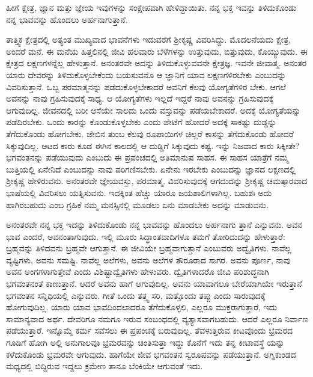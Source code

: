 {\small ಹೀಗೆ ಕ್ಷೇತ್ರ, ಜ್ಞಾನ ಮತ್ತು ಜ್ಞೇಯ ಇವುಗಳನ್ನು ಸಂಕ್ಷೇಪವಾಗಿ ಹೇಳಿದ್ದಾಯಿತು. ನನ್ನ ಭಕ್ತ ಇವನ್ನು ತಿಳಿದುಕೊಂಡು ನನ್ನ ಭಾವವನ್ನು ಹೊಂದಲು ಅರ್ಹನಾಗುತ್ತಾನೆ.}

ತಾತ್ತ್ವಿಕ ಕ್ಷೇತ್ರದಲ್ಲಿ ಅತ್ಯಂತ ಮುಖ್ಯವಾದ ಭಾವನೆಗಳು ಇದುವರೆಗೆ ಶ‍್ರೀಕೃಷ್ಣ ವಿವರಿಸಿದ್ದು. ಮೊದಲನೆಯದು ಕ್ಷೇತ್ರ, ಅಂದರೆ ಮನೆ. ಈ ಮನೆಯ ಹಿತ್ತಲಿನಲ್ಲಿ ಜೀವಿ ಹಲವಾರು ಬೆಳೆಗಳನ್ನು ಉತ್ತುವುದು, ಬಿತ್ತುವುದು, ಕೊಯ್ಯುವುದು. ಈ ಕ್ಷೇತ್ರದ ಲಕ್ಷಣಗಳನ್ನೆಲ್ಲ ಹೇಳುತ್ತಾನೆ. ಅನಂತರವೇ ಅದನ್ನು ತಿಳಿದುಕೊಳ್ಳುವವನೇ ಕ್ಷೇತ್ರಜ್ಞ. ಇವನೇ ಜೀವಾತ್ಮ. ಅನಂತರ ಯಾರು ದೇವರನ್ನು ತಿಳಿದುಕೊಳ್ಳಬೇಕೆಂದು ಬಯಸುವನೊ ಆ ಜ್ಞಾನಿಗೆ ಯಾವ ಲಕ್ಷಣಗಳಿರಬೇಕು ಎಂಬುದನ್ನು ವಿವರಿಸುತ್ತಾನೆ. ಒಬ್ಬ ಪರಮಾತ್ಮನನ್ನು ಪಡೆದುಕೊಳ್ಳಬೇಕಾದರೆ ಅವನಿಗೆ ಕೆಲವು ಯೋಗ್ಯತೆಗಳಿರ ಬೇಕು. ಆಗಲೆ ಅವನನ್ನು ನಾವು ಗ್ರಹಿಸುವುದಕ್ಕೆ ಸಾಧ್ಯ. ಆ ಯೋಗ್ಯತೆಗಳು ಇಲ್ಲದೆ ಇದ್ದರೆ ನಾವು ಅವನನ್ನು ಗ್ರಹಿಸುವುದಕ್ಕೆ ಆಗುವುದಿಲ್ಲ. ಜೀವನದಲ್ಲಿ ಬರೀ ಆಸೆಯೇ ಸಾಲದು ಒಂದು ವಸ್ತುವನ್ನು ಪಡೆಯಬೇಕಾದರೆ. ಅದಕ್ಕೆ ಯೋಗ್ಯತೆಯನ್ನು ಪಡೆದಿರಬೇಕು. ಒಂದು ಕಾರನ್ನು ಕೊಂಡುಕೊಳ್ಳಬೇಕು ಎಂದು ಪೇಟೆಗೆ ಹೋದರೆ ಅದಕ್ಕೆ ಸಾಕಷ್ಟು ದುಡ್ಡನ್ನು ತೆಗೆದುಕೊಂಡು ಹೋಗಬೇಕು. ಜೇಬಿನ ತುಂಬ ಕೆಲವು ರೂಪಾಯಿಗಳ ಚಿಲ್ಲರೆ ಕಾಸನ್ನು ತೆಗೆದುಕೊಂಡು ಹೋದರೆ ಸಿಕ್ಕುವುದಿಲ್ಲ. ಆಟದ ಕಾರು ಕೂಡ ಈಗಿನ ಕಾಲದಲ್ಲಿ ಆ ದುಡ್ಡಿಗೆ ಸಿಕ್ಕುವುದು ಕಷ್ಟ. ಇನ್ನು ನಿಜವಾದ ಕಾರು ಸಿಕ್ಕೀತೇ? ಭಗವಂತನನ್ನು ಪಡೆಯುವುದು ಎಂಬುದು ಈ ಪ್ರಪಂಚದಲ್ಲಿ ಅತಿಮಾನುಷ ಸಾಹಸ. ಈ ಸಾಹಸ ಯಾತ್ರೆಗೆ ನಮ್ಮ ಬುತ್ತಿಯಲ್ಲಿ ಏನೇನಿದೆ ಎಂಬುದನ್ನು ನಾವು ಪರಿಗಣಿಸಬೇಕು. ಏನೇನು ಇರಬೇಕು ಎಂಬುದನ್ನು ಜ್ಞಾನದ ಲಕ್ಷಣದಲ್ಲಿ ಶ‍್ರೀಕೃಷ್ಣ ಹೇಳಿರುವನು. ಅನಂತರವೇ ಜ್ಞೇಯವಸ್ತು, ಪರಮಾತ್ಮ. ವಿವರಿಸುವುದಕ್ಕೆ ಆಗದುದನ್ನು ಶ‍್ರೀಕೃಷ್ಣ ಚಮತ್ಕಾರವಾದ ಭಾಷೆಯಲ್ಲಿ ವಿವರಿಸಲು ಯತ್ನಿಸುವನು. ಇದಕ್ಕಿಂತ ಹೆಚ್ಚು ಯಾರೂ ಜಯಶಾಲಿಗಳಾಗಿಲ್ಲ. ಬಹುಶಃ ಅದು ಹಾಗಿರಬಹುದು ಎಂಬ ಗ್ರಹಿಕೆ ನಮ್ಮ ಮನಸ್ಸಿನಲ್ಲಿ ಮೂಡಲು ಏನು ಮಾಡಬೇಕು ಅದನ್ನು ಮಾಡುವನು.

ಅನಂತರವೇ ನನ್ನ ಭಕ್ತ ಇದನ್ನು ತಿಳಿದುಕೊಂಡು ನನ್ನ ಭಾವವನ್ನು ಹೊಂದಲು ಅರ್ಹನಾಗು ತ್ತಾನೆ ಎನ್ನುವನು. ಅವನ ಭಾವ ಎಂದರೆ, ಅವನಂತಾಗುವುದು. ಇಲ್ಲಿ ಮೂರು ಸಿದ್ಧಾಂತವಾದಿಗಳೂ ತಮಗೆ ತೋರಿದುದನ್ನು ಹೇಳುತ್ತಾರೆ: ಬ್ರಹ್ಮವನ್ನು ತಿಳಿದವನು ಬ್ರಹ್ಮವೇ ಆಗುತ್ತಾನೆ. ಈ ಜೀವಿಯೇ ಬ್ರಹ್ಮವಾಗುತ್ತಾನೆ ಎಂಬುವರು ಅದ್ವೈತಿಗಳು. ನಾವೆಲ್ಲ ವ್ಯಷ್ಟಿಗಳು, ಅವನು ಸಮಷ್ಟಿ. ನಾವೆಲ್ಲ ಅಲೆಗಳು, ಅವನು ಅಲೆಗಳ ತೌರೂರಾದ ಸಾಗರ. ಅವನು ಪೂರ್ಣ, ನಾವು ಅವನ ಅಂಗಗಳಾಗುತ್ತೇವೆ ಎಂದು ವಿಶಿಷ್ಟಾದ್ವೈತಿಗಳು ಹೇಳುವರು. ದ್ವೈತಿಗಳಾದರೊ ಜೀವಿ ಪರಿಶುದ್ಧನಾಗಿ ಭಗವಂತನಂತೆ ಕಾಣುತ್ತಾನೆ. ಆದರೆ ಅವನು ಹಾಗೆ ಆಗುವುದಿಲ್ಲ. ಅವನು ಯಾವಾಗಲೂ ಬೇರೆಯಾಗಿಯೇ ಇರುತ್ತಾನೆ ಭಗವಂತನ ಸನ್ನಿಧಿಯಲ್ಲಿ ಎನ್ನುವರು. ಗೀತೆ ಒಂದು ತತ್ತ್ವ ಸರಿ, ಮತ್ತೊಂದು ತಪ್ಪು ಎಂದು ಸಾರುವುದಕ್ಕೆ ಹೋಗುವುದಿಲ್ಲ. ಯಾರು ಯಾವ ಭಾವದಿಂದಲಾದರೂ ತೆಗೆದುಕೊಳ್ಳಲಿ, ಎಲ್ಲರೂ ಮುಕ್ತರಾಗುತ್ತಾರೆ, ಇದು ಸಾಮಾನ್ಯವಾದ ಅರ್ಥ. ದೇವರಿಗೂ ನಮಗೂ ಇರುವ ಸಂಬಂಧದಲ್ಲಿ ವ್ಯತ್ಯಾಸವಾಗಬಹುದು. ಆದರೆ ಎಲ್ಲರೂ ನಿರ್ವಾಣ ಪಡೆಯುತ್ತಾರೆ. ಇನ್ನೊಮ್ಮೆ ಕರ್ಮ ಸವೆಸಲು ಈ ಪ್ರಪಂಚಕ್ಕೆ ಬರುವುದಿಲ್ಲ. ತೆವಳುತ್ತಿರುವ ಕೀಟವೊಂದು ಭ್ರಮರದ ಗೂಡಿಗೆ ಹೋಗಿ ಅಲ್ಲಿ ಅನುಗಾಲವೂ ಭ್ರಮರವನ್ನು ಚಿಂತಿಸುತ್ತಾ ಇದ್ದು ಕೊನೆಗೆ ಇದು ತನ್ನ ಕೀಟಾವಸ್ಥೆ ಯನ್ನು ಕಳೆದುಕೊಂಡು ಭ್ರಮರವೇ ಆಗುವುದು. ಹಾಗೆಯೇ ಜೀವ ಭಗವಂತನ ಸ್ವರೂಪವನ್ನು ಪಡೆಯುತ್ತಾನೆ. ಅಗ್ನಿಕುಂಡದ ಮಧ್ಯದಲ್ಲಿ ಬಿದ್ದಿರುವ ಇದ್ದಲು ಕ್ರಮೇಣ ತಾನೂ ಬೆಂಕಿಯೇ ಆಗುವಂತೆ ಇದು.

